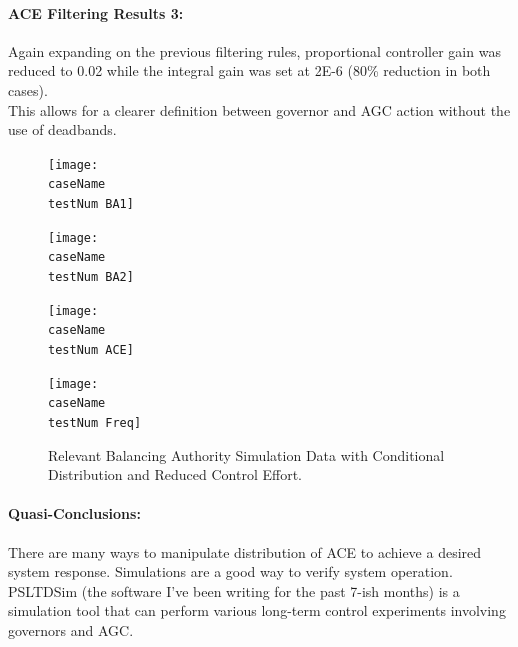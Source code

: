 \documentclass[12pt]{article}
\begin{document}
\paragraph{ACE Filtering Results 3:} Again expanding on the previous filtering rules, proportional controller gain was reduced to 0.02 while the integral gain was set at 2E-6 (80\% reduction in both cases).\\ This allows for a clearer definition between governor and AGC action without the use of deadbands.\vspace{-1.5em}
\renewcommand{\testNum}{3}
\begin{figure}[h!]
		\centering
		\texttt{[image: \\caseName\\testNum BA1]}\vspace{-1em}
\end{figure}\vspace{-1.5em}
\begin{figure}[h!]
		\centering
		\texttt{[image: \\caseName\\testNum BA2]}\vspace{-1em}
\end{figure}\vspace{-1.5em}
\begin{figure}[h!]
		\centering
		\texttt{[image: \\caseName\\testNum ACE]}\vspace{-1em}
\end{figure}\vspace{-1.5em}
\begin{figure}[h!]
		\centering
		\texttt{[image: \\caseName\\testNum Freq]}\vspace{-1em}
		\caption{Relevant Balancing Authority Simulation Data with Conditional Distribution and Reduced Control Effort.}
		\label{PI 2 Results}		 
\end{figure}\vspace{-1.5em}

\paragraph{Quasi-Conclusions:} There are many ways to manipulate distribution of ACE to achieve a desired system response. Simulations are a good way to verify system operation. \\

PSLTDSim (the software I've been writing for the past 7-ish months) is a simulation tool that can perform various long-term control experiments involving governors and AGC.
\end{document}
